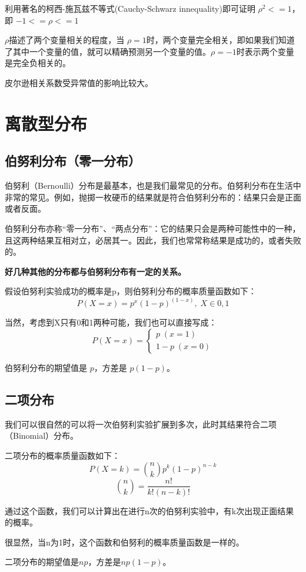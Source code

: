 \documentclass[12pt]{article}
\begin{document}
利用著名的柯西-施瓦兹不等式(Cauchy-Schwarz innequality)即可证明 $\rho^2 <= 1$，即 $-1 <= \rho <= 1$

$\rho$描述了两个变量相关的程度，当 $\rho = 1$时，两个变量完全相关，即如果我们知道了其中一个变量的值，就可以精确预测另一个变量的值。$\rho = -1$时表示两个变量是完全负相关的。

皮尔逊相关系数受异常值的影响比较大。

\section{离散型分布}
\subsection{伯努利分布（零一分布）}
伯努利（Bernoulli）分布是最基本，也是我们最常见的分布。伯努利分布在生活中非常的常见。例如，抛掷一枚硬币的结果就是符合伯努利分布的：结果只会是正面或者反面。

伯努利分布亦称“零一分布”、“两点分布”：它的结果只会是两种可能性中的一种，且这两种结果互相对立，必居其一。因此，我们也常常称结果是成功的，或者失败的。

\textbf{好几种其他的分布都与伯努利分布有一定的关系。}

假设伯努利实验成功的概率是p，则伯努利分布的概率质量函数如下：
$$
P(X=x) = p^x (1 - p)^{(1-x)},\; X \in {0, 1}
$$

当然，考虑到X只有0和1两种可能，我们也可以直接写成：
$$
P(X=x) =
\begin{cases}
p\;(x=1) \\
1-p\;(x=0)
\end{cases}
$$

伯努利分布的期望值是 $p$，方差是 $p(1−p)$。

\subsection{二项分布}
我们可以很自然的可以将一次伯努利实验扩展到多次，此时其结果符合二项（Binomial）分布。

二项分布的概率质量函数如下：
$$
P(X=k) = \binom{n}{k}p^{k}(1-p)^{n-k}
$$
$$
\binom{n}{k}  = \frac{n!}{k!(n-k)!}
$$

通过这个函数，我们可以计算出在进行n次的伯努利实验中，有k次出现正面结果的概率。

很显然，当n为1时，这个函数和伯努利的概率质量函数是一样的。

二项分布的期望值是$np$，方差是$np(1-p)$。
\end{document}
